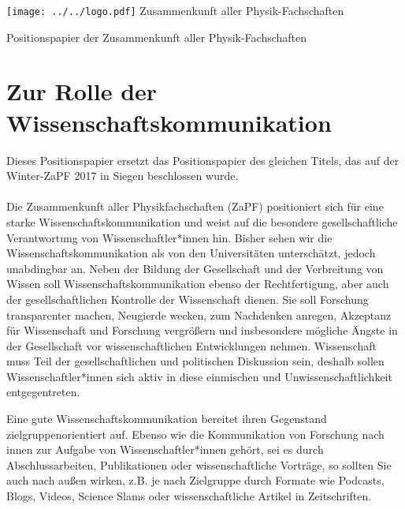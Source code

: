 \documentclass[DIV=calc]{scrartcl}
\begin{document}
    \hspace{0.87\textwidth}
    \begin{minipage}{120pt}
        \vspace{-1.8cm}
        \texttt{[image: ../../logo.pdf]}
        \centering
        \small Zusammenkunft aller Physik-Fachschaften
    \end{minipage}
    \begin{center}
        \huge{Positionspapier der Zusammenkunft aller Physik-Fachschaften}\vspace{.25\baselineskip}\\
        \normalsize
    \end{center}
    \vspace{1cm}

\section*{Zur Rolle der Wissenschaftskommunikation}

Dieses Positionspapier ersetzt das Positionspapier des gleichen Titels, das auf der Winter-ZaPF 2017 in Siegen beschlossen wurde.\\~\\
Die Zusammenkunft aller Physikfachschaften (ZaPF) positioniert sich für eine starke Wissenschaftskommunikation und weist auf die besondere gesellschaftliche Verantwortung von Wissenschaftler*innen hin.
Bisher sehen wir die Wissenschaftskommunikation als von den Universitäten unterschätzt, jedoch unabdingbar an.
Neben der Bildung der Gesellschaft und der Verbreitung von Wissen soll Wissenschaftskommunikation ebenso der Rechtfertigung, aber auch der gesellschaftlichen Kontrolle der Wissenschaft dienen.
Sie soll Forschung transparenter machen, Neugierde wecken, zum Nachdenken anregen, Akzeptanz für Wissenschaft und Forschung vergrößern und insbesondere mögliche Ängste in der Gesellschaft vor wissenschaftlichen Entwicklungen nehmen. 
Wissenschaft muss Teil der gesellschaftlichen und politischen Diskussion sein, deshalb sollen Wissenschaftler*innen sich aktiv in diese einmischen und  Unwissenschaftlichkeit entgegentreten.

Eine gute Wissenschaftskommunikation bereitet ihren Gegenstand zielgruppenorientiert auf. 
Ebenso wie die Kommunikation von Forschung nach innen zur Aufgabe von Wissenschaftler*innen gehört, sei es durch Abschlussarbeiten, Publikationen oder wissenschaftliche Vorträge, so sollten Sie auch nach außen wirken, z.B. je nach Zielgruppe durch Formate wie Podcasts, Blogs, Videos, Science Slams oder wissenschaftliche Artikel in Zeitschriften.\\
\end{document}

